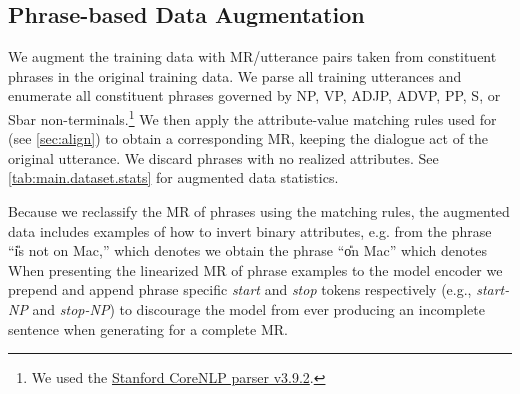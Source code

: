 \subsection{Phrase-based Data Augmentation}
\label{sec:dataaug}

We augment the training data with MR/utterance pairs taken from constituent
phrases in the original training data.  We parse all training utterances and
enumerate all constituent phrases governed by NP, VP, ADJP, ADVP, PP, S, 
or Sbar
non-terminals.\footnote{We used the
\href{https://stanfordnlp.github.io/CoreNLP/}{Stanford CoreNLP parser
v3.9.2}.} We then apply the attribute-value matching rules used for
 (see \autoref{sec:align}) to obtain a corresponding MR, keeping
the dialogue act of the original utterance. We discard phrases with no realized
attributes.  See \autoref{tab:main.dataset.stats} for augmented data
statistics.

Because we reclassify the MR of phrases using the matching rules, the
augmented  data includes examples of how to invert binary attributes, e.g.
from the phrase ``\U{is not on Mac,}'' which denotes
 we obtain the phrase ``\U{on Mac}''
which denotes  When presenting the linearized
MR of phrase examples to the model encoder we prepend and append phrase
specific \textit{start} and \textit{stop} tokens respectively (e.g.,
\textit{start-NP} and \textit{stop-NP}) to discourage the model from ever
producing an incomplete sentence when generating for a complete MR.
